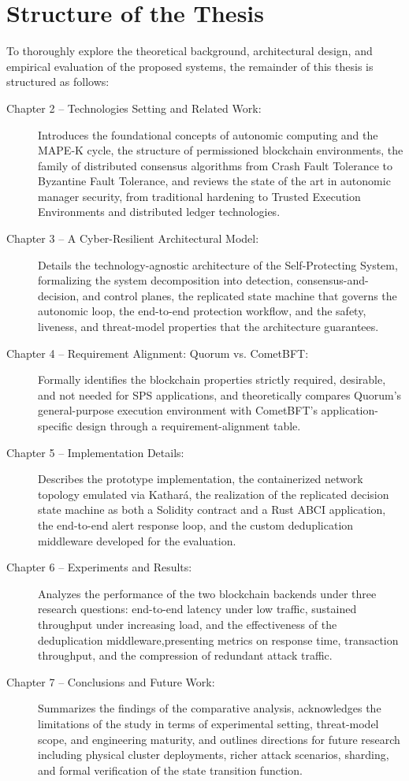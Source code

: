 \section{Structure of the Thesis}
\label{sec:intro_structure}

To thoroughly explore the theoretical background, architectural design, and empirical evaluation of the proposed systems, the remainder of this thesis is structured as follows:

\begin{description}
    \item[Chapter 2 -- Technologies Setting and Related Work:] Introduces the foundational concepts of autonomic computing and the MAPE-K cycle, the structure of permissioned blockchain environments, the family of distributed consensus algorithms from Crash Fault Tolerance to Byzantine Fault Tolerance, and reviews the state of the art in autonomic manager security, from traditional hardening to Trusted Execution Environments and distributed ledger technologies.
    \item[Chapter 3 -- A Cyber-Resilient Architectural Model:] Details the technology-agnostic architecture of the Self-Protecting System, formalizing the system decomposition into detection, consensus-and-decision, and control planes, the replicated state machine that governs the autonomic loop, the end-to-end protection workflow, and the safety, liveness, and threat-model properties that the architecture guarantees.
    \item[Chapter 4 -- Requirement Alignment: Quorum vs. CometBFT:] Formally identifies the blockchain properties strictly required, desirable, and not needed for SPS applications, and theoretically compares Quorum's general-purpose execution environment with CometBFT's application-specific design through a requirement-alignment table.
    \item[Chapter 5 -- Implementation Details:] Describes the prototype implementation, the containerized network topology emulated via Kathará, the realization of the replicated decision state machine as both a Solidity contract and a Rust ABCI application, the end-to-end alert response loop, and the custom deduplication middleware developed for the evaluation.
    \item[Chapter 6 -- Experiments and Results:] Analyzes the performance of the two blockchain backends under three research questions: end-to-end latency under low traffic, sustained throughput under increasing load, and the effectiveness of the deduplication middleware,presenting metrics on response time, transaction throughput, and the compression of redundant attack traffic.
    \item[Chapter 7 -- Conclusions and Future Work:] Summarizes the findings of the comparative analysis, acknowledges the limitations of the study in terms of experimental setting, threat-model scope, and engineering maturity, and outlines directions for future research including physical cluster deployments, richer attack scenarios, sharding, and formal verification of the state transition function.
\end{description}
